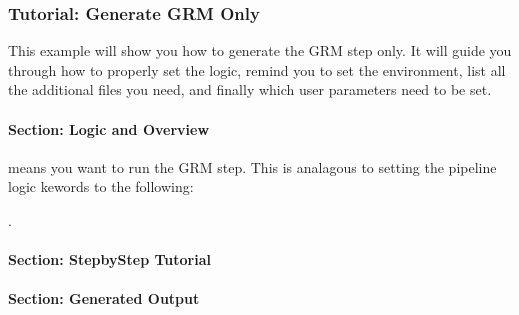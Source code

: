 \documentclass[letterpaper,10pt,english]{sphinxmanual}
\begin{document}
\subsubsection{Tutorial: Generate GRM Only}
\label{\detokenize{generateGRMonlyTutorial:tutorial-generate-grm-only}}\label{\detokenize{generateGRMonlyTutorial::doc}}
This example will show you how to generate the GRM step only.  It will guide you through how to properly set the logic, remind you to set the environment, list all the additional files you need, and finally which user parameters need to be set.


\paragraph{Section: Logic and Overview}
\label{\detokenize{generateGRMonlyTutorial:section-logic-and-overview}}
 means you want to run the GRM step.  This is analagous to setting the pipeline logic kewords to the following:

         .

\begin{sphinxVerbatim}[commandchars=\\\{\}]
\end{sphinxVerbatim}


\paragraph{Section: Step\sphinxhyphen{}by\sphinxhyphen{}Step Tutorial}
\label{\detokenize{generateGRMonlyTutorial:section-step-by-step-tutorial}}

\paragraph{Section: Generated Output}
\label{\detokenize{generateGRMonlyTutorial:section-generated-output}}
\end{document}

